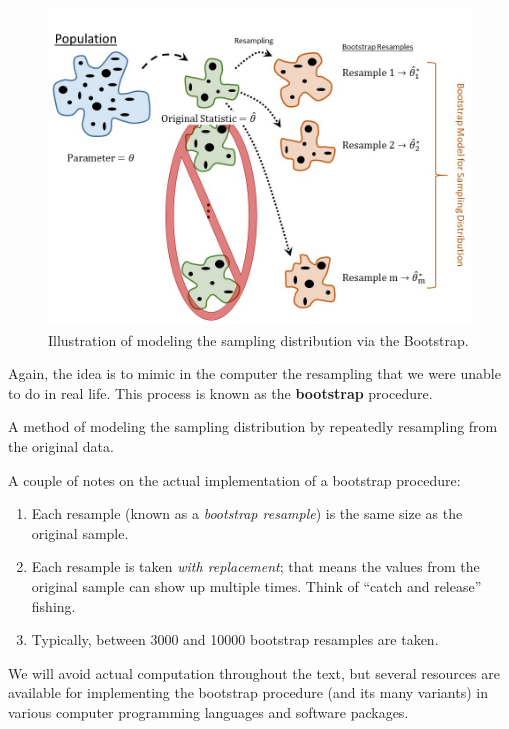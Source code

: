 \documentclass[]{book}
\providecommand{\tightlist}{%
  \setlength{\itemsep}{0pt}\setlength{\parskip}{0pt}}
\theoremstyle{plain}
\theoremstyle{mydefn}
\theoremstyle{myexmpl}
\theoremstyle{remark}
\let\BeginKnitrBlock\begin \let\EndKnitrBlock\end
\let\BeginKnitrBlock\begin \let\EndKnitrBlock\end
\begin{document}
\begin{figure}

{\centering \includegraphics[width=0.8\linewidth]{./images/SamplingDistns-Bootstrap} 

}

\caption{Illustration of modeling the sampling distribution via the Bootstrap.}\label{fig:samplingdistns-bootstrap}
\end{figure}

Again, the idea is to mimic in the computer the resampling that we were
unable to do in real life. This process is known as the
\textbf{bootstrap} procedure.

\BeginKnitrBlock{definition}[Bootstrap]
\protect\hypertarget{def:defn-bootstrap}{}{\label{def:defn-bootstrap}
{} }A method of modeling the sampling
distribution by repeatedly resampling from the original data.
\EndKnitrBlock{definition}

A couple of notes on the actual implementation of a bootstrap procedure:

\begin{enumerate}
\def\labelenumi{\arabic{enumi}.}
\tightlist
\item
  Each resample (known as a \emph{bootstrap resample}) is the same size
  as the original sample.
\item
  Each resample is taken \emph{with replacement}; that means the values
  from the original sample can show up multiple times. Think of ``catch
  and release'' fishing.
\item
  Typically, between 3000 and 10000 bootstrap resamples are taken.
\end{enumerate}

We will avoid actual computation throughout the text, but several
resources are available for implementing the bootstrap procedure (and
its many variants) in various computer programming languages and
software packages.
\end{document}
